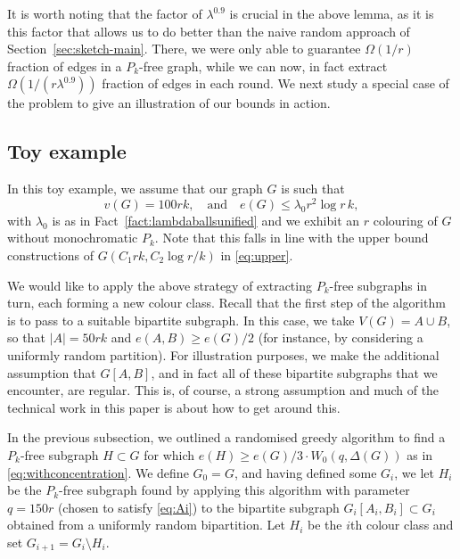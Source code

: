 \documentclass[12pt,reqno]{amsart}
\theoremstyle{remark}
\numberwithin{theorem}{section}
\renewcommand{\(}{\bigl(}
\renewcommand{\)}{\bigr)\vphantom{)}}
\renewcommand{\leq}{\le}
\renewcommand{\geq}{\ge}
\renewcommand{\le}{\leqslant}
\renewcommand{\ge}{\geqslant}
\begin{document}
It is worth noting that the factor of $\lambda^{0.9}$ is crucial in the above lemma, as it is this factor that allows us to do better than the naive random approach of Section~\ref{sec:sketch-main}. There, we were only able to guarantee $\Omega(1/r)$ fraction of edges in a $P_k$-free graph, while we can now, in fact extract $\Omega(1/(r\lambda^{0.9}))$ fraction of edges in each round. We next study a special case of the problem to give an illustration of our bounds in action. 

\subsection{Toy example}

In this toy example, we assume that our graph  $G$ is such that
\[ v(G) = 100rk, \quad\text{and}\quad e(G) \leq \lambda_0 r^2 \log r\, k, \]
 with $\lambda_0$ is as in Fact~\ref{fact:lambdaballsunified} and we exhibit an $r$ colouring of $G$ without monochromatic $P_k$. Note that this falls in line with the upper bound constructions of $G(C_1rk, C_2 \log r/k)$ in \eqref{eq:upper}.
 
We would like to apply the above strategy of extracting $P_k$-free subgraphs in turn, each forming a new colour class. Recall that the first step of the algorithm is to pass to a suitable bipartite subgraph. In this case, we take $V(G)=A\cup B$, so that $|A|= 50rk$ and $e(A,B)\geq e(G)/2$ (for instance, by considering a uniformly random partition). For illustration purposes, we make the additional assumption that $G[A,B]$, and in fact all of these bipartite subgraphs that we encounter, are regular. This is, of course, a strong assumption and much of the technical work in this paper is about how to get around this.

In the previous subsection, we outlined a randomised greedy algorithm to find a $P_k$-free subgraph $H \subset G$ for which $e(H)\geq e(G)/3\cdot W_0(q,\Delta(G))$ as in \eqref{eq:withconcentration}. We define $G_0=G$, and having defined some $G_i$, we let $H_i$ be the $P_k$-free subgraph found by applying this algorithm with parameter $q=150r$ (chosen to satisfy \eqref{eq:Ai}) to the bipartite subgraph $G_i[A_i, B_i] \subset G_i$ obtained from a uniformly random bipartition. Let $H_i$ be the $i$th colour class and set $G_{i+1}=G_i\setminus H_i$. 
\end{document}
